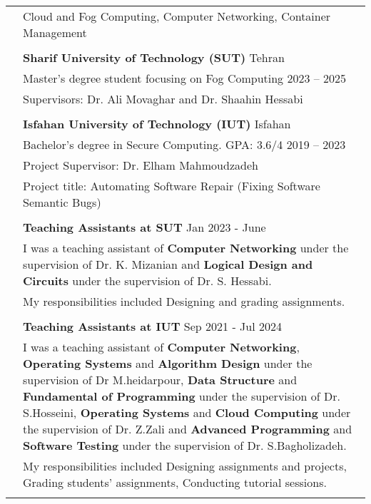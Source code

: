 \documentclass[letterpaper, 11pt]{article}
\begin{document}
\begin{longtable}{p{1.3in}p{4.8in}}


\nohyphens{\color{MidnightBlue}{Research interests}}
& Cloud and Fog Computing, Computer Networking, Container Management \\
& \\


\color{MidnightBlue}{Education} 
& \textbf{Sharif University of Technology (SUT)} \hfill Tehran \\ 
& Master's degree student focusing on Fog Computing \hfill 2023 -- 2025 \\
& Supervisors: Dr. Ali Movaghar and Dr. Shaahin Hessabi  \\
& \\

& \textbf{Isfahan University of Technology (IUT)} \hfill Isfahan \\ 
& Bachelor's degree in Secure Computing. GPA: 3.6/4 \hfill 2019 -- 2023 \\
& Project Supervisor: Dr. Elham Mahmoudzadeh \\
& Project title: Automating Software Repair (Fixing Software Semantic Bugs) \\
& \\


{\color{MidnightBlue}{Teaching Experience}} 
& \textbf{Teaching Assistants at SUT} \hfill Jan 2023 - June \\
& I was a teaching assistant of \textbf{Computer Networking} under the supervision of Dr. K. Mizanian and 
 \textbf{Logical Design and Circuits} under the supervision of Dr. S. Hessabi. \\
& My responsibilities included Designing and grading assignments.\\
& \\

& \textbf{Teaching Assistants at IUT} \hfill Sep 2021 - Jul 2024 \\
& I was a teaching assistant of \textbf{Computer Networking}, \textbf{Operating Systems} and \textbf{Algorithm Design} under the supervision of Dr M.heidarpour, \textbf{Data Structure} and \textbf{Fundamental of Programming} under the supervision of Dr. S.Hosseini, \textbf{Operating Systems} and \textbf{Cloud Computing} under the supervision of Dr. Z.Zali and \textbf{Advanced Programming} and \textbf{Software Testing} under the supervision of Dr. S.Bagholizadeh. \\
& My responsibilities included Designing assignments and projects, Grading students' assignments, Conducting tutorial sessions.\\
& \\


\end{longtable}
\end{document}
